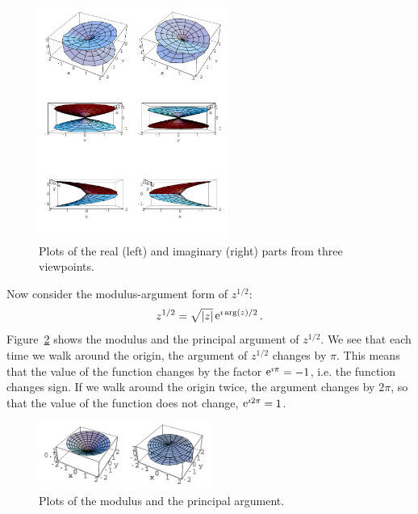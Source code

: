\begin{Example}
  \begin{figure}[htbp!]
    \begin{center}
      \includegraphics[width=0.55\textwidth]{fcv/function/z_12_re_im}
    \end{center}
    \caption{Plots of the real (left) and 
      imaginary (right) parts from three viewpoints.}
    \label{z_12_re_im}
  \end{figure}

  Now consider the modulus-argument form of $z^{1/2}$:
  \[
  z^{1/2} = \sqrt{|z|} \mathop{\mathrm{e}}\nolimits^{\imath \arg(z) / 2}.
  \]
  Figure~\ref{z_12_ma} shows the modulus and the principal argument of $z^{1/2}$.
  We see that each time we walk around the origin, the argument of $z^{1/2}$
  changes by $\pi$.  This means that the value of the function changes
  by the factor $\mathop{\mathrm{e}}\nolimits^{\imath \pi} = -1$, i.e. the function changes sign.  
  If we walk around the origin twice, the argument
  changes by $2 \pi$, so that the value of the function does not change,
  $\mathop{\mathrm{e}}\nolimits^{\imath 2 \pi} = 1$.

  \begin{figure}[htbp!]
    \begin{center}
      \includegraphics[width=0.5\textwidth]{fcv/function/z_12_ma}
    \end{center}
    \caption{Plots of the modulus and the principal argument.}
    \label{z_12_ma}
  \end{figure}


\end{Example}
